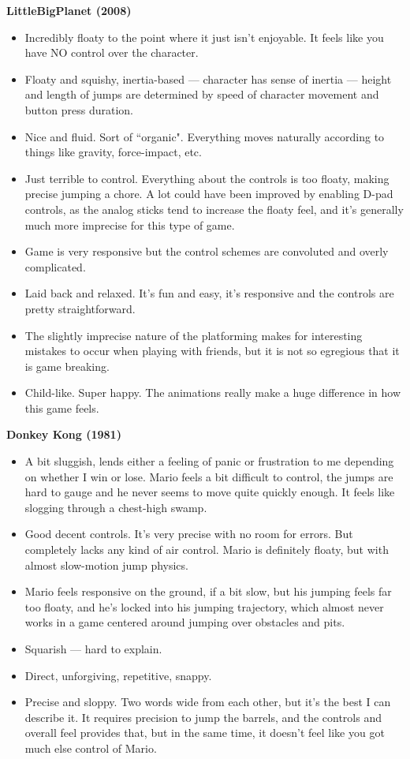 \textbf{LittleBigPlanet (2008)}
\vspace{-5mm}
\begin{itemize}[noitemsep,nolistsep]
\item Incredibly floaty to the point where it just isn't enjoyable. It feels like you have NO control over the character.
\item Floaty and squishy, inertia-based --- character has sense of inertia --- height and length of jumps are determined by speed of character movement and button press duration.
\item Nice and fluid. Sort of ``organic". Everything moves naturally according to things like gravity, force-impact, etc.
\item Just terrible to control. Everything about the controls is too floaty, making precise jumping a chore. A lot could have been improved by enabling D-pad controls, as the analog sticks tend to increase the floaty feel, and it's generally much more imprecise for this type of game.
\item Game is very responsive but the control schemes are convoluted and overly complicated. 
\item Laid back and relaxed. It's fun and easy, it's responsive and the controls are pretty straightforward.
\item The slightly imprecise nature of the platforming makes for interesting mistakes to occur when playing with friends, but it is not so egregious that it is game breaking. 
\item Child-like. Super happy. The animations really make a huge difference in how this game feels.
\end{itemize}

\textbf{Donkey Kong (1981)}
\vspace{-5mm}
\begin{itemize}[noitemsep,nolistsep]
\item A bit sluggish, lends either a feeling of panic or frustration to me depending on whether I win or lose. Mario feels a bit difficult to control, the jumps are hard to gauge and he never seems to move quite quickly enough. It feels like slogging through a chest-high swamp.
\item Good decent controls. It's very precise with no room for errors. But completely lacks any kind of air control. Mario is definitely floaty, but with almost slow-motion jump physics.
\item Mario feels responsive on the ground, if a bit slow, but his jumping feels far too floaty, and he's locked into his jumping trajectory, which almost never works in a game centered around jumping over obstacles and pits.
\item Squarish --- hard to explain.
\item Direct, unforgiving, repetitive, snappy.
\item Precise and sloppy. Two words wide from each other, but it's the best I can describe it. It requires precision to jump the barrels, and the controls and overall feel provides that, but in the same time, it doesn't feel like you got much else control of Mario.
\end{itemize}

